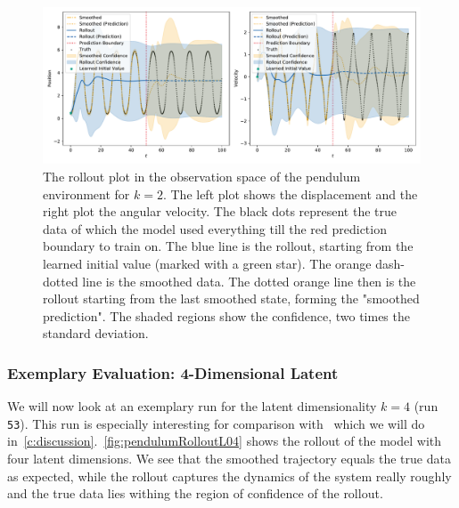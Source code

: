 			\begin{figure}
				\centering
				\includegraphics[width=\linewidth]{figures/results/pendulum/run-latent-dim-02/rollout-observations-N0.pdf}
				\caption{The rollout plot in the observation space of the pendulum environment for \(k = 2\). The left plot shows the displacement and the right plot the angular velocity. The black dots represent the true data of which the model used everything till the red prediction boundary to train on. The blue line is the rollout, starting from the learned initial value (marked with a green star). The orange dash-dotted line is the smoothed data. The dotted orange line then is the rollout starting from the last smoothed state, forming the "smoothed prediction". The shaded regions show the confidence, \ie two times the standard deviation.}
				\label{fig:pendulumRolloutL02}
			\end{figure}

		\subsubsection{Exemplary Evaluation: 4-Dimensional Latent}
			We will now look at an exemplary run for the latent dimensionality \( k = 4 \) (run \texttt{53}). This run is especially interesting for comparison with~\cite{mortonDeepVariationalKoopman2019a} which we will do in~\autoref{c:discussion}.~\autoref{fig:pendulumRolloutL04} shows the rollout of the model with four latent dimensions. We see that the smoothed trajectory equals the true data as expected, while the rollout captures the dynamics of the system really roughly and the true data lies withing the region of confidence of the rollout.

